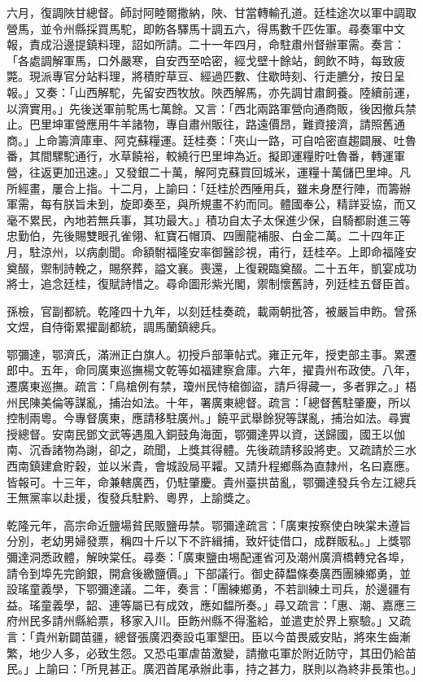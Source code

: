 \begin{pinyinscope}
六月，復調陜甘總督。師討阿睦爾撒納，陜、甘當轉輸孔道。廷桂途次以軍中調取營馬，並令州縣採買馬駝，即飭各驛馬十調五六，得馬數千匹佐軍。尋奏軍中文報，責成沿邊提鎮料理，詔如所請。二十一年四月，命駐肅州督辦軍需。奏言：「各處調解軍馬，口外嚴寒，自安西至哈密，經戈壁十餘站，飼飲不時，每致疲斃。現派專官分站料理，將積貯草豆、經過匹數、住歇時刻、行走臕分，按日呈報。」又奏：「山西解駝，先留安西牧放。陜西解馬，亦先調甘肅飼養。陸續前運，以濟實用。」先後送軍前駝馬七萬餘。又言：「西北兩路軍營向通商販，後因撤兵禁止。巴里坤軍營應用牛羊諸物，專自肅州販往，路遠價昂，難資接濟，請照舊通商。」上命籌濟庫車、阿克蘇糧運。廷桂奏：「夾山一路，可自哈密直趨闢展、吐魯番，其間騾駝通行，水草饒裕，較繞行巴里坤為近。擬即運糧貯吐魯番，轉運軍營，往返更加迅速。」又發銀二十萬，解阿克蘇買回城米，運糧十萬儲巴里坤。凡所經畫，屢合上指。十二月，上諭曰：「廷桂於西陲用兵，雖未身歷行陣，而籌辦軍需，每有朕旨未到，旋即奏至，與所規畫不約而同。體國奉公，精詳妥協，而又毫不累民，內地若無兵事，其功最大。」積功自太子太保進少保，自騎都尉進三等忠勤伯，先後賜雙眼孔雀翎、紅寶石帽頂、四團龍補服、白金二萬。二十四年正月，駐涼州，以病劇聞。命額駙福隆安率御醫診視，甫行，廷桂卒。上即命福隆安奠醊，禦制詩輓之，賜祭葬，謚文襄。喪還，上復親臨奠醊。二十五年，凱宴成功將士，追念廷桂，復賦詩惜之。尋命圖形紫光閣，禦制懷舊詩，列廷桂五督臣首。

孫檢，官副都統。乾隆四十九年，以刻廷桂奏疏，載兩朝批答，被嚴旨申飭。曾孫文煜，自侍衛累擢副都統，調馬蘭鎮總兵。

鄂彌達，鄂濟氏，滿洲正白旗人。初授戶部筆帖式。雍正元年，授吏部主事。累遷郎中。五年，命同廣東巡撫楊文乾等如福建察倉庫。六年，擢貴州布政使。八年，遷廣東巡撫。疏言：「鳥槍例有禁，瓊州民恃槍御盜，請戶得藏一，多者罪之。」梧州民陳美倫等謀亂，捕治如法。十年，署廣東總督。疏言：「總督舊駐肇慶，所以控制兩粵。今專督廣東，應請移駐廣州。」饒平武舉餘猊等謀亂，捕治如法。尋實授總督。安南民鄧文武等遇風入銅鼓角海面，鄂彌達畀以資，送歸國，國王以伽南、沉香諸物為謝，卻之，疏聞，上獎其得體。先後疏請移設將吏。又疏請於三水西南鎮建倉貯穀，並以米貴，會城設局平糶。又請升程鄉縣為直隸州，名曰嘉應。皆報可。十三年，命兼轄廣西，仍駐肇慶。貴州臺拱苗亂，鄂彌達發兵令左江總兵王無黨率以赴援，復發兵駐黔、粵界，上諭獎之。

乾隆元年，高宗命近鹽場貧民販鹽毋禁。鄂彌達疏言：「廣東按察使白映棠未遵旨分別，老幼男婦發票，稱四十斤以下不許緝捕，致奸徒借口，成群販私。」上獎鄂彌達洞悉政體，解映棠任。尋奏：「廣東鹽由埸配運省河及潮州廣濟橋轉兌各埠，請令到埠先完餉銀，開倉後繳鹽價。」下部議行。御史薛馧條奏廣西團練鄉勇，並設瑤童義學，下鄂彌達議。二年，奏言：「團練鄉勇，不若訓練土司兵，於邊疆有益。瑤童義學，韶、連等屬已有成效，應如馧所奏。」尋又疏言：「惠、潮、嘉應三府州民多請州縣給票，移家入川。臣飭州縣不得濫給，並遣吏於界上察驗。」又疏言：「貴州新闢苗疆，總督張廣泗奏設屯軍墾田。臣以今苗畏威安貼，將來生齒漸繁，地少人多，必致生怨。又恐屯軍虐苗激變，請撤屯軍於附近防守，其田仍給苗民。」上諭曰：「所見甚正。廣泗首尾承辦此事，持之甚力，朕則以為終非長策也。」


\end{pinyinscope}
